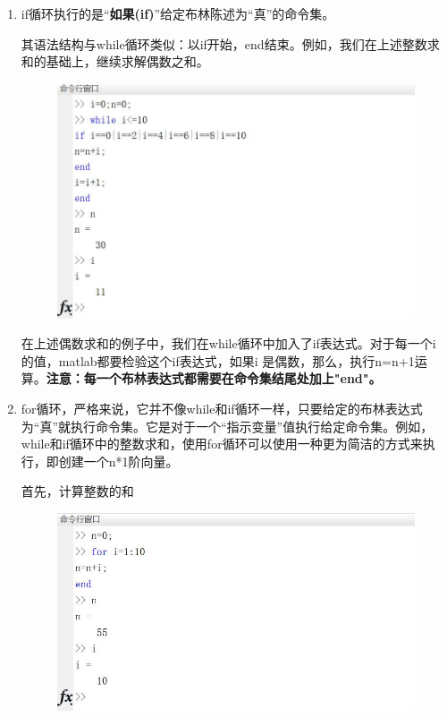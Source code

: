 \documentclass[cn,10pt,math=newtx,citestyle=gb7714-2015,bibstyle=gb7714-2015]{elegantbook}
\begin{document}
{{\begin{enumerate}
		\item if循环执行的是“\textbf{如果(if)}”给定布林陈述为“真”的命令集。
		
		其语法结构与while循环类似：以if开始，end结束。例如，我们在上述整数求和的基础上，继续求解偶数之和。
		
		\begin{figure}[htbp!]
			\centering
			\includegraphics[width=0.8\linewidth]{FIG/evensum}
			\centering
		\end{figure}
		
		在上述偶数求和的例子中，我们在while循环中加入了if表达式。对于每一个i 的值，matlab都要检验这个if表达式，如果i 是偶数，那么，执行n=n+1运算。\textbf{注意：每一个布林表达式都需要在命令集结尾处加上"end"。}
		
		\item for循环，严格来说，它并不像while和if循环一样，只要给定的布林表达式为“真”就执行命令集。它是对于一个“指示变量”值执行给定命令集。例如，while和if循环中的整数求和，使用for循环可以使用一种更为简洁的方式来执行，即创建一个n*1阶向量。
		
		首先，计算整数的和
		
		\begin{figure}[htbp!]
			\centering
			\includegraphics[width=0.8\linewidth]{FIG/vectorsum}
			\centering
		\end{figure}
	\end{enumerate}
	
}}
\end{document}
